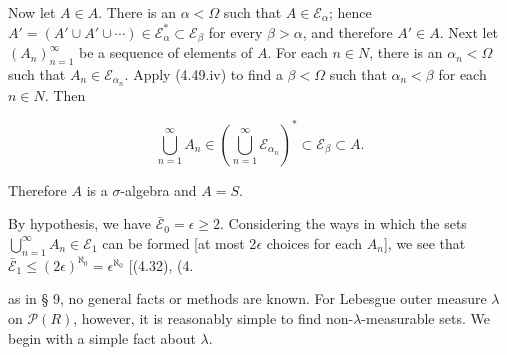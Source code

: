 Now let $A \in A$. There is an $\alpha < \Omega$ such that $A \in \mathcal{E}_\alpha$; hence $A' = (A' \cup A' \cup \cdots) \in \mathcal{E}_\alpha^* \subset \mathcal{E}_\beta$ for every $\beta > \alpha$, and therefore $A' \in A$. Next let $(A_n)_{n=1}^{\infty}$ be a sequence of elements of $A$. For each $n \in N$, there is an $\alpha_n < \Omega$ such that $A_n \in \mathcal{E}_{\alpha_n}$. Apply (4.49.iv) to find a $\beta < \Omega$ such that $\alpha_n < \beta$ for each $n \in N$. Then

$$\bigcup_{n=1}^{\infty} A_n \in \left( \bigcup_{n=1}^{\infty} \mathcal{E}_{\alpha_n} \right)^* \subset \mathcal{E}_\beta \subset A.$$

Therefore $A$ is a $\sigma$-algebra and $A = S$.

By hypothesis, we have $\bar{\mathcal{E}}_0 = \epsilon \geq 2$. Considering the ways in which the sets $\bigcup_{n=1}^{\infty} A_n \in \mathcal{E}_1$ can be formed [at most 2$\epsilon$ choices for each $A_n$], we see that $\bar{\mathcal{E}}_1 \leq (2\epsilon)^{\aleph_0} = \epsilon^{\aleph_0}$ [(4.32), (4.

as in § 9, no general facts or methods are known. For Lebesgue outer measure $\lambda$ on $\mathcal{P}(R)$, however, it is reasonably simple to find non-$\lambda$-measurable sets. We begin with a simple fact about $\lambda$.